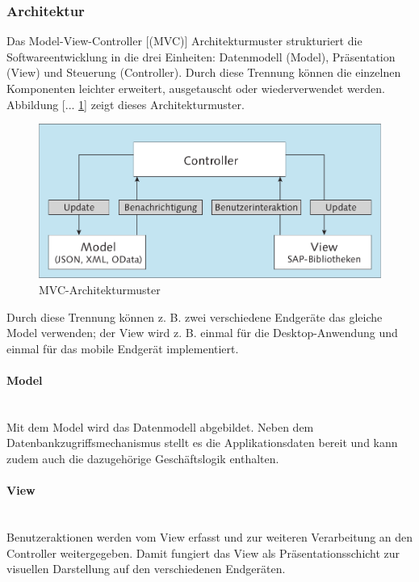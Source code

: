 \subsubsection{Architektur}
\glqq Das Model-View-Controller [(MVC)] Architekturmuster strukturiert die Softwareentwicklung in die drei Einheiten: Datenmodell (Model), Präsentation (View) und Steuerung (Controller). Durch diese Trennung können die einzelnen Komponenten leichter erweitert, ausgetauscht oder wiederverwendet werden. Abbildung [... \ref{fig:mvcarch}] zeigt dieses Architekturmuster.
	
\vspace{1em}
\begin{figure}[htb]
  \centering
  \includegraphics[width=0.7\linewidth]{abb/mvc_arch2}
  \caption[MVC-Architekturmuster]{MVC-Architekturmuster \cite[S.124]{AntoEinf2014}}
  \label{fig:mvcarch}
\end{figure}

Durch diese Trennung können z. B. zwei verschiedene Endgeräte das gleiche Model verwenden; der View wird z. B. einmal für die Desktop-Anwendung und einmal für das mobile Endgerät implementiert.\grqq{}\cite[S.123]{AntoEinf2014}

\paragraph{Model}$\;$ \\
Mit dem Model wird das Datenmodell abgebildet. Neben dem Datenbankzugriffsmechanismus stellt es die Applikationsdaten bereit und kann zudem auch die dazugehörige Geschäftslogik enthalten.

\paragraph{View}$\;$ \\
Benutzeraktionen werden vom View erfasst und zur weiteren Verarbeitung an den Controller weitergegeben. Damit fungiert das View als Präsentationsschicht zur visuellen Darstellung auf den verschiedenen Endgeräten.

